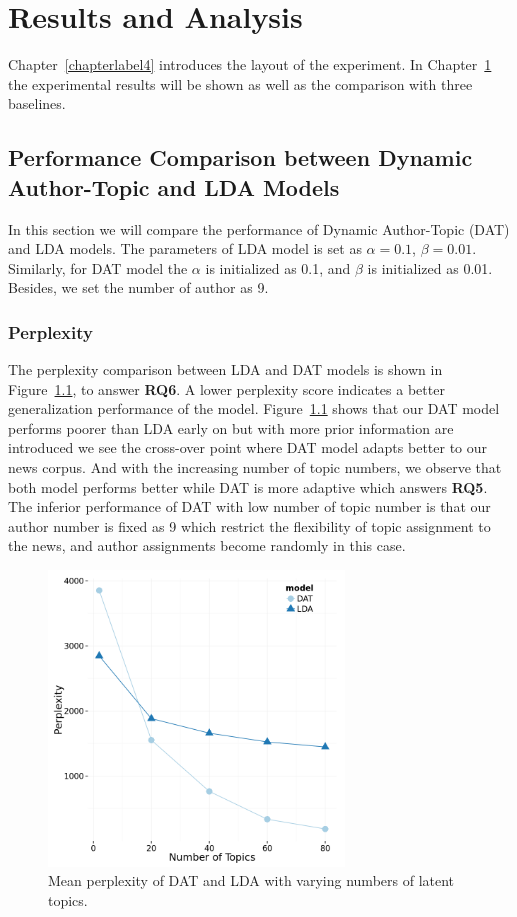 \chapter{Results and Analysis}
\label{chapterlabel5}
Chapter~\ref{chapterlabel4} introduces the layout of the experiment. In Chapter~\ref{chapterlabel5} the experimental results will be shown as well as the comparison with three baselines.

\section{Performance Comparison between Dynamic Author-Topic and LDA Models}\label{sec:ldadat}

In this section we will compare the performance of Dynamic Author-Topic (DAT) and LDA models. The parameters of LDA  model is set as $\alpha = 0.1$, $\beta = 0.01$.
Similarly, for DAT model the $\alpha$  is initialized as 0.1, and $\beta$ is initialized as 0.01. Besides, we set the number of author as 9.

\subsection{Perplexity}
The perplexity comparison between LDA and DAT models is shown in Figure~\ref{fig:lda_dat_perplexity}, to answer \textbf{RQ6}. A lower perplexity score indicates a better generalization performance of the model. Figure~\ref{fig:lda_dat_perplexity} shows that our DAT model performs poorer than LDA early on but with more prior information are introduced we see the cross-over point where DAT model adapts better to our news corpus. And with the increasing number of topic numbers, we observe that both model performs better while DAT is more adaptive which answers \textbf{RQ5}. The inferior performance of DAT with low number of topic number is that our author number is fixed as 9 which restrict the flexibility of topic assignment to the news, and author assignments become randomly in this case.

\begin{figure}[h]
\centering
\includegraphics[width=0.7\textwidth]{figures/lda_dat_perplexity.png}
\caption{Mean perplexity of DAT and LDA with varying numbers of latent topics.}
\label{fig:lda_dat_perplexity}
\end{figure}

